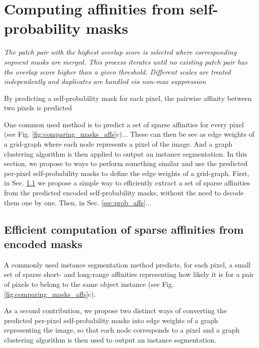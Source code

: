 \section{Computing affinities from self-probability masks}

\cite{liu2016multi} \emph{The patch pair with the highest overlap score is selected where corresponding segment masks are merged. This process iterates until no existing patch pair has the overlap score higher than a given threshold. Different scales are treated independently and duplicates are handled via non-max suppression}

By predicting a self-probability mask for each pixel, the pairwise affinity between two pixels is predicted 


One common used method is to predict a set of sparse affinities for every pixel (see Fig. \ref{fig:comparing_masks_affs}c)... 
These can then be see as edge weights of a grid-graph where each node represents a pixel of the image. And a graph clustering algorithm is then applied to output an instance segmentation.
In this section, we propose to ways to perform something similar and use the predicted per-pixel self-probability masks to define the edge weights of a grid-graph.
First, in Sec. \ref{sec:efficient_affs} we propose a simple way to efficiently extract a set of sparse affinities from the predicted encoded self-probability masks, without the need to decode them one by one. Then, in Sec. \ref{sec:prob_affs}...

\subsection{Efficient computation of sparse affinities from encoded masks}\label{sec:efficient_affs}
A commonly used instance segmentation method predicts, for each pixel, a small set of sparse short- and long-range affinities representing how likely it is for a pair of pixels to belong to the same object instance (see Fig. \ref{fig:comparing_masks_affs}c).



As a second contribution, we propose two distinct ways of converting the predicted per-pixel self-probability masks into edge weights of a graph representing the image, so that each node corresponds to a pixel and a graph clustering algorithm is then used to output an instance segmentation.


